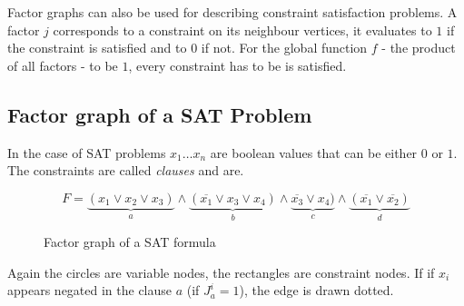 \newpage
Factor graphs can also be used for describing constraint satisfaction problems. A factor $j$ corresponds to a constraint on its neighbour vertices, it evaluates to $1$ if the constraint is satisfied and to $0$ if not. For the global function $f$ - the product of all factors - to be $1$, every constraint has to be is satisfied.  \newline


\subsection{Factor graph of a SAT Problem}
In the case of SAT problems $x_1 \ldots x_n$ are boolean values that can be either $0$ or $1$. The constraints are called \textit{clauses} and are. 


\begin{example}
$$F = \underbrace{(x_1 \lor x_2 \lor x_3)}_{a} \land \underbrace{(\overline{x_1} \lor x_3 \lor x_4) }_{b}\land \underbrace{\overline{x_3} \lor x_4)}_{c} \land \underbrace{(\overline{x_1} \lor \overline{x_2})}_{d}$$
\begin{figure}[h]
\centering

\caption{Factor graph of a SAT formula}
\end{figure}

Again the circles are variable nodes, the rectangles are constraint nodes. If if $x_i$ appears negated in the clause $a$ (if $J_a^i = 1$), the edge is drawn dotted.  

\end{example}

